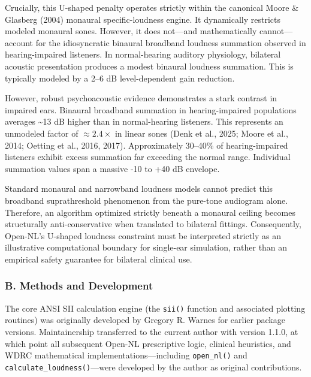 \documentclass[
  12pt,
]{article}
\begin{document}
Crucially, this U-shaped penalty operates strictly within the canonical
Moore \& Glasberg (2004) monaural specific-loudness engine. It
dynamically restricts modeled monaural sones. However, it does not---and
mathematically cannot---account for the idiosyncratic binaural broadband
loudness summation observed in hearing-impaired listeners. In
normal-hearing auditory physiology, bilateral acoustic presentation
produces a modest binaural loudness summation. This is typically modeled
by a 2--6 dB level-dependent gain reduction.

However, robust psychoacoustic evidence demonstrates a stark contrast in
impaired ears. Binaural broadband summation in hearing-impaired
populations averages \textasciitilde13 dB higher than in normal-hearing
listeners. This represents an unmodeled factor of \(\approx 2.4\times\)
in linear sones (Denk et al., 2025; Moore et al., 2014; Oetting et al.,
2016, 2017). Approximately 30--40\% of hearing-impaired listeners
exhibit excess summation far exceeding the normal range. Individual
summation values span a massive -10 to +40 dB envelope.

Standard monaural and narrowband loudness models cannot predict this
broadband suprathreshold phenomenon from the pure-tone audiogram alone.
Therefore, an algorithm optimized strictly beneath a monaural ceiling
becomes structurally anti-conservative when translated to bilateral
fittings. Consequently, Open-NL's U-shaped loudness constraint must be
interpreted strictly as an illustrative computational boundary for
single-ear simulation, rather than an empirical safety guarantee for
bilateral clinical use.

\subsubsection{B. Methods and
Development}\label{b.-methods-and-development}

The core ANSI SII calculation engine (the \texttt{sii()} function and
associated plotting routines) was originally developed by Gregory R.
Warnes for earlier package versions. Maintainership transferred to the
current author with version 1.1.0, at which point all subsequent Open-NL
prescriptive logic, clinical heuristics, and WDRC mathematical
implementations---including \texttt{open\_nl()} and
\texttt{calculate\_loudness()}---were developed by the author as
original contributions.
\end{document}
